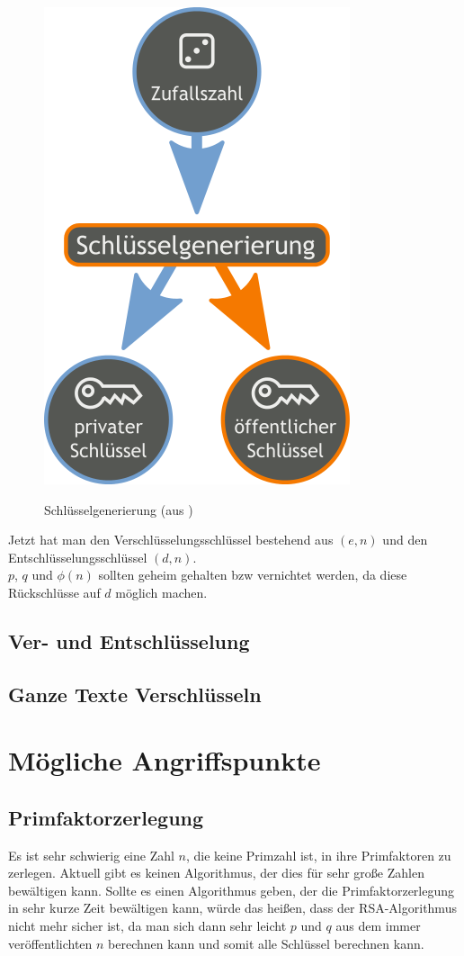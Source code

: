 \documentclass[12pt,a4paper]{scrartcl}
\begin{document}
\begin{figure}
\includegraphics[scale=0.3]{Orange_blue_public_private_keygeneration} \\
\caption{Schlüsselgenerierung (aus \cite{wikipedia})}
\label{fig:figure1}
\end{figure}

Jetzt hat man den Verschlüsselungsschlüssel bestehend aus $(e, n)$ und den Entschlüsselungsschlüssel $(d, n)$. \\
$p$, $q$ und $\phi(n)$ sollten geheim gehalten bzw vernichtet werden, da diese Rückschlüsse auf $d$ möglich machen.
	
	\subsection{Ver- und Entschlüsselung}
	
	\subsection{Ganze Texte Verschlüsseln}

\section{Mögliche Angriffspunkte}
	\subsection{Primfaktorzerlegung}
	Es ist sehr schwierig eine Zahl $n$, die keine Primzahl ist, in ihre Primfaktoren zu zerlegen. Aktuell gibt es keinen Algorithmus, der dies für sehr große Zahlen bewältigen kann. Sollte es einen Algorithmus geben, der die Primfaktorzerlegung in sehr kurze Zeit bewältigen kann, würde das heißen, dass der RSA-Algorithmus nicht mehr sicher ist, da man sich dann sehr leicht $p$ und $q$ aus dem immer veröffentlichten $n$ berechnen kann und somit alle Schlüssel berechnen kann.
	
\end{document}
